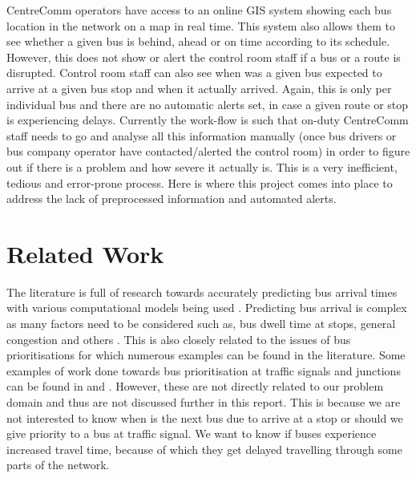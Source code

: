 CentreComm operators have access to an online GIS system showing each bus location in the network on a map in real time. This system also allows them to see whether a given bus is behind, ahead or on time according to its schedule. However, this does not show or alert the control room staff if a bus or a route is disrupted. Control room staff can also see when was a given bus expected to arrive at a given bus stop and when it actually arrived. Again, this is only per individual bus and there are no automatic alerts set, in case a given route or stop is experiencing delays. Currently the work-flow is such that on-duty CentreComm staff needs to go and analyse all this information manually (once bus drivers or bus company operator have contacted/alerted the control room) in order to figure out if there is a problem and how severe it actually is. This is a very inefficient, tedious and error-prone process. Here is where this project comes into place to address the lack of preprocessed information and automated alerts.

\section{Related Work}
The literature is full of research towards accurately predicting bus arrival times with various computational models being used \cite{altinkaya2013urban}. Predicting bus arrival is complex as many factors need to be considered such as, bus dwell time at stops, general congestion and others \cite{jeong2005prediction}. This is also closely related to the issues of bus prioritisations for which numerous examples can be found in the literature. Some examples of work done towards bus prioritisation at traffic signals and junctions can be found in \cite{eps52676} and \cite{clarke2007}. However, these are not directly related to our problem domain and thus are not discussed further in this report. This is because we are not interested to know when is the next bus due to arrive at a stop or should we give priority to a bus at traffic signal. We want to know if buses experience increased travel time, because of which they get delayed travelling through some parts of the network. 
 
 

